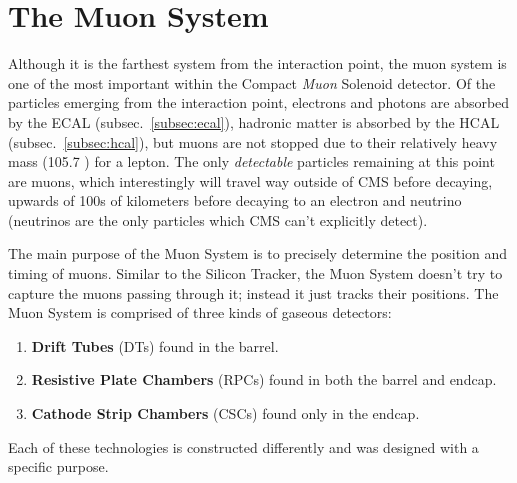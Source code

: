 \section{The Muon System}
\label{sec:muon_sys}

Although it is the farthest system from the interaction point, the muon system is one of the most important within the Compact \emph{Muon} Solenoid detector.
Of the particles emerging from the interaction point, electrons and photons are absorbed by the ECAL (subsec.~\ref{subsec:ecal}), hadronic matter is absorbed by the HCAL (subsec.~\ref{subsec:hcal}), but muons are not stopped due to their relatively heavy mass (105.7 \MeV) for a lepton.
The only \emph{detectable} particles remaining at this point are muons, which interestingly will travel way outside of CMS before decaying, upwards of 100s of kilometers before decaying to an electron and neutrino (neutrinos are the only particles which CMS can't explicitly detect).

The main purpose of the Muon System is to precisely determine the position and timing of muons.
Similar to the Silicon Tracker, the Muon System doesn't try to capture the muons passing through it;
instead it just tracks their positions. 
The Muon System is comprised of three kinds of gaseous detectors: 
\begin{enumerate}
    \item {\bf Drift Tubes} (DTs) found in the barrel.
    \item {\bf Resistive Plate Chambers} (RPCs) found in both the barrel and endcap.
    \item {\bf Cathode Strip Chambers} (CSCs) found only in the endcap.
\end{enumerate}
Each of these technologies is constructed differently and was designed with a specific purpose. 


